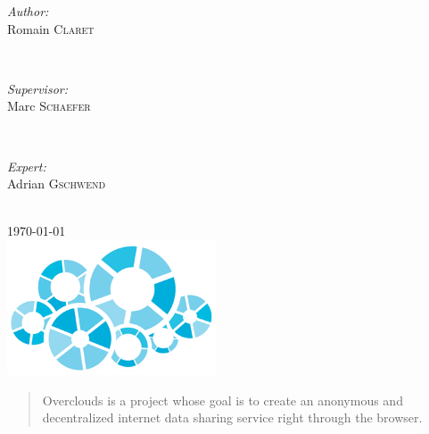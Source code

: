 \begin{titlepage}
\begin{minipage}{0.2\textwidth}
\begin{flushleft} \large
\emph{Author:} \\[0.2cm]
Romain \textsc{Claret} %
\end{flushleft}
\end{minipage}
~
\begin{minipage}{0.2\textwidth}
\begin{flushleft} \large
\emph{Supervisor:} \\[0.2cm]
Marc \textsc{Schaefer} %
\end{flushleft}
\end{minipage}
~
\begin{minipage}{0.2\textwidth}
\begin{flushleft} \large
\emph{Expert:} \\[0.2cm]
Adrian \textsc{Gschwend} %
\end{flushleft}
\end{minipage} \\[1.5cm]

{\large \today} \\[0.8cm] %

\includegraphics[height=4cm]{overclouds.png}\\[0.3cm]
 
\begin{abstract}
Overclouds is a project whose goal is to create an anonymous and decentralized internet data sharing service right through the browser.
\end{abstract}

\end{titlepage}